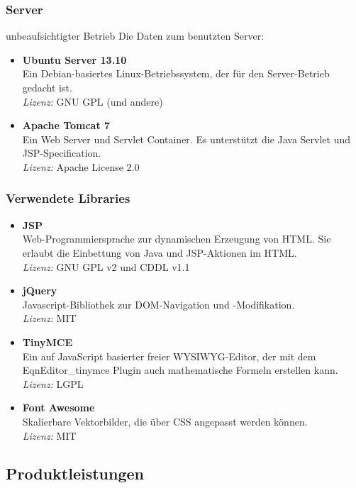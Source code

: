\subsubsection{Server}
unbeaufsichtigter Betrieb
Die Daten zum benutzten Server:
\begin{itemize}
	\item \textbf{Ubuntu Server 13.10} \\
	Ein Debian-basiertes Linux-Betriebssystem, der für den Server-Betrieb gedacht ist. \\
	\textit{Lizenz:} GNU GPL (und andere)
	\item \textbf{Apache Tomcat 7} \\
	Ein Web Server und Servlet Container. Es unterstützt die Java Servlet  und JSP-Specification. \\
	\textit{Lizenz:} Apache License 2.0
\end{itemize}

\subsubsection{Verwendete Libraries}
\begin{itemize}
	\item \textbf{JSP} \\
	Web-Programmiersprache zur dynamischen Erzeugung von HTML. Sie erlaubt die Einbettung von Java und JSP-Aktionen im HTML. \\
	\textit{Lizenz:} GNU GPL v2 und CDDL v1.1
	\item \textbf{jQuery} \\
	Javascript-Bibliothek zur DOM-Navigation und -Modifikation.\\
	\textit{Lizenz:} MIT
	\item \textbf{TinyMCE} \\
	Ein auf JavaScript basierter freier WYSIWYG-Editor, der mit dem EqnEditor\_tinymce Plugin auch mathematische Formeln erstellen kann. \\
	\textit{Lizenz:} LGPL
	\item \textbf{Font Awesome} \\
	Skalierbare Vektorbilder, die über CSS angepasst werden können. \\
	\textit{Lizenz:} MIT
\end{itemize}

\subsection{Produktleistungen}

